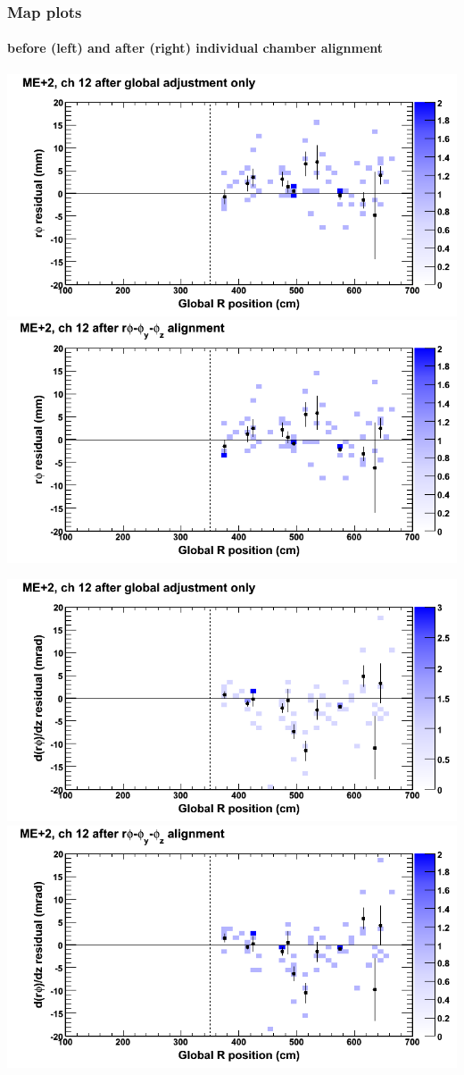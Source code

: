 \documentclass[compress]{beamer}
\begin{document}
\begin{frame}
\frametitle{Map plots}
\framesubtitle{before (left) and after (right) individual chamber alignment}
\includegraphics[width=0.5\linewidth]{ringmapplots_3dof/before_CSCvsr_mep2ch12_x.png} \includegraphics[width=0.5\linewidth]{ringmapplots_3dof/after_CSCvsr_mep2ch12_x.png}

\includegraphics[width=0.5\linewidth]{ringmapplots_3dof/before_CSCvsr_mep2ch12_dxdz.png} \includegraphics[width=0.5\linewidth]{ringmapplots_3dof/after_CSCvsr_mep2ch12_dxdz.png}
\end{frame}
\end{document}
